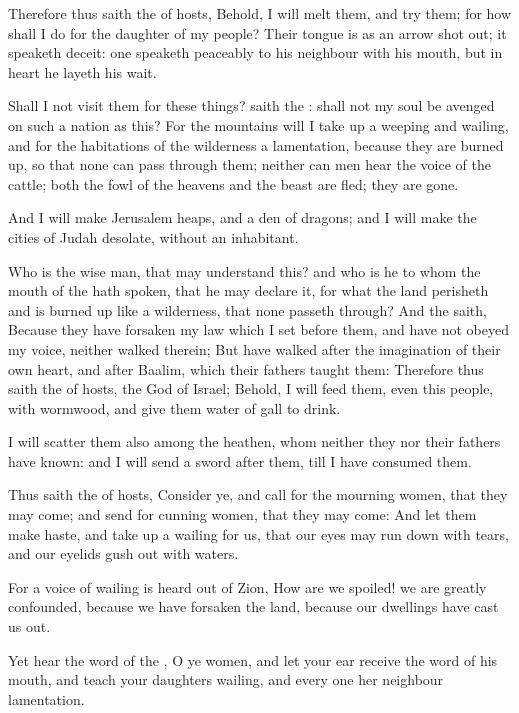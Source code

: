 \verse Therefore thus saith the \LORD of hosts, Behold, I will melt them, and try them; for how shall I do for the daughter of my people?  \verse Their tongue is as an arrow shot out; it speaketh deceit: one speaketh peaceably to his neighbour with his mouth, but in heart he layeth his wait.

\verse Shall I not visit them for these things? saith the \LORD: shall not my soul be avenged on such a nation as this?  \verse For the mountains will I take up a weeping and wailing, and for the habitations of the wilderness a lamentation, because they are burned up, so that none can pass through them; neither can men hear the voice of the cattle; both the fowl of the heavens and the beast are fled; they are gone.

\verse And I will make Jerusalem heaps, and a den of dragons; and I will make the cities of Judah desolate, without an inhabitant.

\verse Who is the wise man, that may understand this? and who is he to whom the mouth of the \LORD hath spoken, that he may declare it, for what the land perisheth and is burned up like a wilderness, that none passeth through?  \verse And the \LORD saith, Because they have forsaken my law which I set before them, and have not obeyed my voice, neither walked therein; \verse But have walked after the imagination of their own heart, and after Baalim, which their fathers taught them: \verse Therefore thus saith the \LORD of hosts, the God of Israel; Behold, I will feed them, even this people, with wormwood, and give them water of gall to drink.

\verse I will scatter them also among the heathen, whom neither they nor their fathers have known: and I will send a sword after them, till I have consumed them.

\verse Thus saith the \LORD of hosts, Consider ye, and call for the mourning women, that they may come; and send for cunning women, that they may come: \verse And let them make haste, and take up a wailing for us, that our eyes may run down with tears, and our eyelids gush out with waters.

\verse For a voice of wailing is heard out of Zion, How are we spoiled!  we are greatly confounded, because we have forsaken the land, because our dwellings have cast us out.

\verse Yet hear the word of the \LORD, O ye women, and let your ear receive the word of his mouth, and teach your daughters wailing, and every one her neighbour lamentation.


